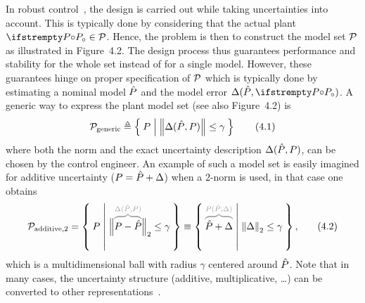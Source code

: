 \documentclass{responseletter}
\begin{document}
\begin{enumerate}
\begin{newquote}
In robust control~\citep{Zhou1996,Skogestad2005}, the design is carried out while taking uncertainties into account.
This is typically done by considering that the actual plant $\true{\Plant} \in \ModelSet[]$.
Hence, the problem is then to construct the model set $\ModelSet[]$ as illustrated in Figure~4.2.
The design process thus guarantees performance and stability for the whole set instead of for a single model.
However, these guarantees hinge on proper specification of $\ModelSet[]$ which is typically done by estimating a nominal model $\estimated{\Plant}$ and the model error $\Delta(\estimated{\Plant}, \true{\Plant})$.
A generic way to express the plant model set (see also Figure~4.2) is
\begin{equation}
  \ModelSet[]_{\mathrm{generic}} 
  \isdef 
  \Set{ \Plant | \norm{\Delta(\estimated{\Plant}, \Plant)} \leq \gamma}
  \label{eq:lrmhinf:model-set:generic}
  \tag{4.1}
\end{equation}
where both the norm and the exact uncertainty description $\Delta(\estimated{\Plant}, \Plant)$, can be chosen by the control engineer.
An example of such a model set is easily imagined for additive uncertainty ($\Plant = \estimated{\Plant} + \Delta$) when a $2$-norm is used, in that case one obtains
\begin{equation}
  \ModelSet[]_{\mathrm{additive,2}} 
  = 
  \Set{ \Plant | \Bignorm[2]{ \ezbrace{\Plant - \estimated{\Plant}}{\Delta(\estimated{\Plant}, \Plant)}  } \leq \gamma}
  \equiv
  \Set{  \ezbrace{\estimated{\Plant}  + \Delta}{\Plant(\estimated{\Plant}, \Delta)}  | \norm[2]{\Delta} \leq \gamma}
  \text{,}
  \tag{4.2}
\end{equation}
which is a multidimensional ball with radius $\gamma$ centered around $\estimated{\Plant}$.
Note that in many cases, the uncertainty structure (additive, multiplicative, \ldots) can be converted to other representations~\citep{Douma2005}.


\end{newquote}
\end{enumerate}
\end{document}

